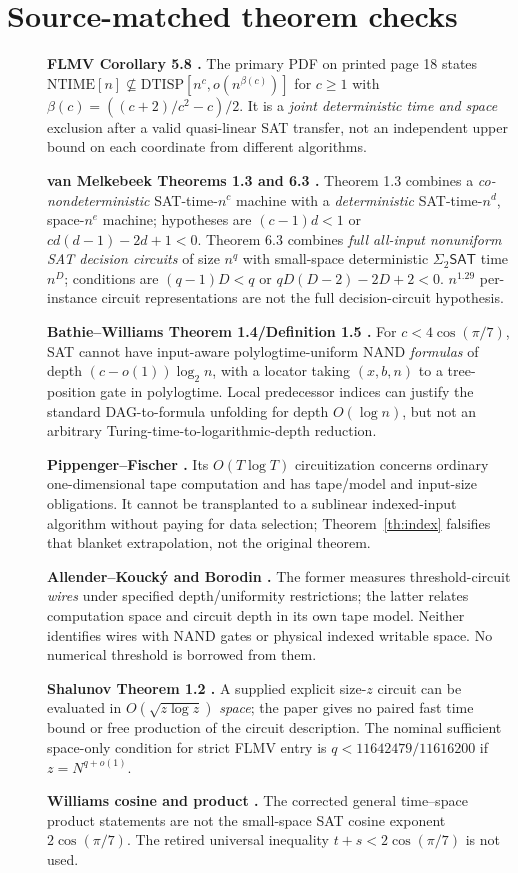 \documentclass[11pt]{article}
\newcommand{\SAT}{\mathsf{SAT}}
\begin{document}
\section{Source-matched theorem checks}
\begin{description}
\item[] \textbf{FLMV Corollary 5.8 \cite{flmv}.} The primary PDF on printed page 18 states
$\mathrm{NTIME}[n]\not\subseteq\mathrm{DTISP}[n^c,o(n^{\beta(c)})]$ for $c\ge1$ with $\beta(c)=((c+2)/c^2-c)/2$. It is a \emph{joint deterministic time and space} exclusion after a valid quasi-linear SAT transfer, not an independent upper bound on each coordinate from different algorithms.
\item[] \textbf{van Melkebeek Theorems 1.3 and 6.3 \cite{vm}.} Theorem 1.3 combines a \emph{co-nondeterministic} SAT-time-$n^c$ machine with a \emph{deterministic} SAT-time-$n^d$, space-$n^e$ machine; hypotheses are $(c-1)d<1$ or $cd(d-1)-2d+1<0$. Theorem 6.3 combines \emph{full all-input nonuniform SAT decision circuits} of size $n^q$ with small-space deterministic $\Sigma_2\SAT$ time $n^D$; conditions are $(q-1)D<q$ or $qD(D-2)-2D+2<0$. $n^{1.29}$ per-instance circuit representations are not the full decision-circuit hypothesis.
\item[] \textbf{Bathie--Williams Theorem 1.4/Definition 1.5 \cite{bw}.} For $c<4\cos(\pi/7)$, SAT cannot have input-aware polylogtime-uniform NAND \emph{formulas} of depth $(c-o(1))\log_2n$, with a locator taking $(x,b,n)$ to a tree-position gate in polylogtime. Local predecessor indices can justify the standard DAG-to-formula unfolding for depth $O(\log n)$, but not an arbitrary Turing-time-to-logarithmic-depth reduction.
\item[] \textbf{Pippenger--Fischer \cite{pf}.} Its $O(T\log T)$ circuitization concerns ordinary one-dimensional tape computation and has tape/model and input-size obligations. It cannot be transplanted to a sublinear indexed-input algorithm without paying for data selection; Theorem~\ref{th:index} falsifies that blanket extrapolation, not the original theorem.
\item[] \textbf{Allender--Kouck\'y \cite{ak} and Borodin \cite{bor}.} The former measures threshold-circuit \emph{wires} under specified depth/uniformity restrictions; the latter relates computation space and circuit depth in its own tape model. Neither identifies wires with NAND gates or physical indexed writable space. No numerical threshold is borrowed from them.
\item[] \textbf{Shalunov Theorem 1.2 \cite{sh}.} A supplied explicit size-$z$ circuit can be evaluated in $O(\sqrt{z\log z})$ \emph{space}; the paper gives no paired fast time bound or free production of the circuit description. The nominal sufficient space-only condition for strict FLMV entry is $q<11642479/11616200$ if $z=N^{q+o(1)}$.
\item[] \textbf{Williams cosine and product \cite{wil}.} The corrected general time--space product statements are not the small-space SAT cosine exponent $2\cos(\pi/7)$. The retired universal inequality $t+s<2\cos(\pi/7)$ is not used.
\end{description}
\end{document}
